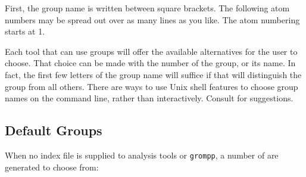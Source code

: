 First, the group name is written between square brackets. The following
atom numbers may be spread out over as many lines as you like. The
atom numbering starts at 1.

%
Each tool that can use groups will offer the available alternatives
for the user to choose. That choice can be made with the number of the
group, or its name. In fact, the first few letters of the group
name will suffice if that will distinguish the group from all others.
There are ways to use Unix shell features to choose group names
on the command line, rather than interactively. Consult {\wwwpage}
for suggestions.

\subsection{Default Groups}
\label{subsec:defaultgroups}
When no index file is supplied to analysis tools or {\tt grompp},
a number of  are generated to choose from:
